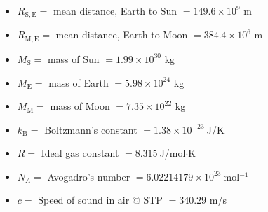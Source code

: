 \documentclass[letterpaper,landscape,10pt]{article}
\newenvironment{myitemize}
{\begin{itemize}
	\setlength{\itemsep}{0pt}
	\setlength{\parskip}{0pt}
	\setlength{\parsep}{0pt}}
{\end{itemize}}
\begin{document}
{\begin{multicols}{4}
\begin{myitemize}
		\vspace{4pt}

	  	\item[$R_\mathrm{S,E} = $]
		  mean distance, Earth to Sun $ = 149.6\times10^{9}$ m
		\item[$R_\mathrm{M,E} = $]
		  mean distance, Earth to Moon $ = 384.4\times10^{6}$ m

		\vspace{4pt}

	  	\item[$M_\mathrm{S} = $]
		  mass of Sun $ = 1.99\times10^{30}$ kg
		\item[$M_\mathrm{E} = $]
		  mass of Earth $ = 5.98\times10^{24}$ kg
		\item[$M_\mathrm{M} = $]
		  mass of Moon $ = 7.35\times10^{22}$ kg

		\vspace{4pt}

	  	\item[$k_\mathrm{B} = $]
		  Boltzmann's constant $ = 1.38 \times 10^{-23} \>$J/K
		\item[$R = $]
		  Ideal gas constant $ = 8.315 \>$J/mol$\cdot$K
		\item[$N_A = $]
		  Avogadro's number $ = 6.02214179 \times 10^{23} \>$mol$^{-1}$
		
		\vspace{4pt}

		\item[$c = $]
		  Speed of sound in air @ STP $ = 340.29$ m/s
	\end{myitemize}


\end{multicols}}
\end{document}
